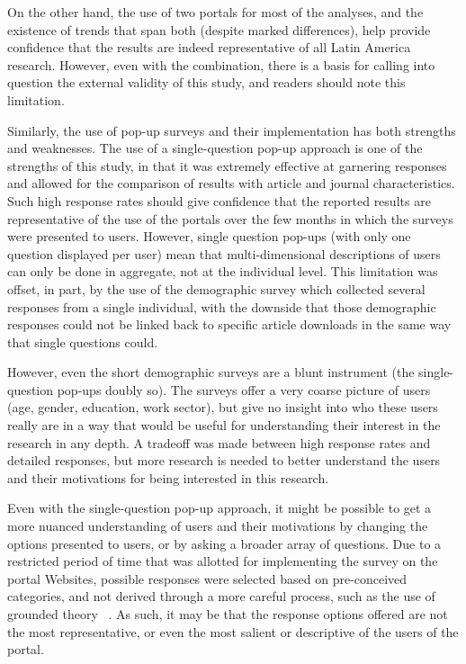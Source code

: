 On the other hand, the use of two portals for most of the analyses, and the existence of trends that span both (despite marked differences), help provide confidence that the results are indeed representative of all Latin America research. However, even with the combination, there is a basis for calling into question the external validity of this study, and readers should note this limitation.

Similarly, the use of pop-up surveys and their implementation has both strengths and weaknesses. The use of a single-question pop-up approach is one of the strengths of this study, in that it was extremely effective at garnering responses and allowed for the comparison of results with article and journal characteristics. Such high response rates should give confidence that the reported results are representative of the use of the portals over the few months in which the surveys were presented to users. However, single question pop-ups (with only one question displayed per user) mean that multi-dimensional descriptions of users can only be done in aggregate, not at the individual level. This limitation was offset, in part, by the use of the demographic survey which collected several responses from a single individual, with the downside that those demographic responses could not be linked back to specific article downloads in the same way that single questions could.

However, even the short demographic surveys are a blunt instrument (the single-question pop-ups doubly so). The surveys offer a very coarse picture of users (age, gender, education, work sector), but give no insight into who these users really are in a way that would be useful for understanding their interest in the research in any depth. A tradeoff was made between high response rates and detailed responses, but more research is needed to better understand the users and their motivations for being interested in this research.

Even with the single-question pop-up approach, it might be possible to get a more nuanced understanding of users and their motivations by changing the options presented to users, or by asking a broader array of questions. Due to a restricted period of time that was allotted for implementing the survey on the portal Websites, possible responses were selected based on pre-conceived categories, and not derived through a more careful process, such as the use of grounded theory ~\citep{Creswell2012}. As such, it may be that the response options offered are not the most representative, or even the most salient or descriptive of the users of the portal.

